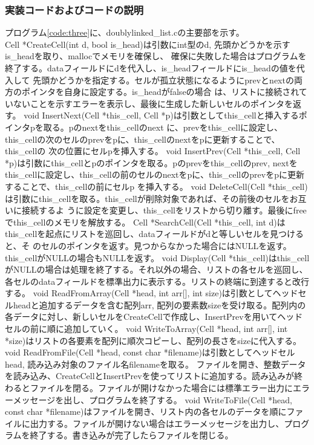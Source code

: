 \documentclass{ltjsarticle}
\begin{document}
\subsubsection{実装コードおよびコードの説明}\label{subsubsec:実装コードおよびコードの説明3}
プログラム\ref{code:three}に、doublylinked\_list.cの主要部を示す。\\ \indent
Cell *CreateCell(int d, bool is\_head)は引数にint型のd, 先頭かどうかを示すis\_headを取り、mallocでメモリを確保し、
確保に失敗した場合はプログラムを終了する。dataフィールドにdを代入し、is\_headフィールドにis_headの値を代入して
先頭かどうかを指定する。セルが孤立状態になるようにprevとnextの両方のポインタを自身に設定する。is\_headがfalseの場合
は、リストに接続されていないことを示すエラーを表示し、最後に生成した新しいセルのポインタを返す。
void InsertNext(Cell *this\_cell, Cell *p)は引数としてthis\_cellと挿入するポインタpを取る。pのnextをthis\_cellのnext
に、prevをthis\_cellに設定し、this\_cellの次のセルのprevをpに、this\_cellのnextをpに更新することで、this\_cellの
次の位置にセルpを挿入する。
void InsertPrev(Cell *this\_cell, Cell *p)は引数にthis\_cellとpのポインタを取る。pのprevをthis\_cellのprev, 
nextをthis\_cellに設定し、this\_cellの前のセルのnextをpに、this\_cellのprevをpに更新することで、this\_cellの前にセルp
を挿入する。
void DeleteCell(Cell *this\_cell)は引数にthis\_cellを取る。this\_cellが削除対象であれば、その前後のセルをお互いに接続するよ
うに設定を変更し、this\_cellをリストから切り離す。最後にfreeでthis\_cellのメモリを解放する。
Cell *SearchCell(Cell *this\_cell, int d)はthis_cellを起点にリストを巡回し、dataフィールドがdと等しいセルを見つけると、そ
のセルのポインタを返す。見つからなかった場合にはNULLを返す。this\_cellがNULLの場合もNULLを返す。
void Display(Cell *this\_cell)はthis\_cellがNULLの場合は処理を終了する。それ以外の場合、リストの各セルを巡回し、各セルのdataフィールドを標準出力に表示する。リストの終端に到達すると改行する。
void ReadFromArray(Cell *head, int arr[], int size)は引数としてヘッドセルheadと追加するデータを含む配列arr, 配列の要素数sizeを受け取る。配列内の各データに対し、新しいセルをCreateCellで作成し、InsertPrevを用いてヘッドセルの前に順に追加していく。
void WriteToArray(Cell *head, int arr[], int *size)はリストの各要素を配列に順次コピーし、配列の長さをsizeに代入する。
void ReadFromFile(Cell *head, const char *filename)は引数としてヘッドセルhead, 読み込み対象のファイル名filenameを取る。
ファイルを開き、整数データを読み込み、CreateCellとInsertPrevを使ってリストに追加する。読み込みが終わるとファイルを閉る。ファイルが開けなかった場合には標準エラー出力にエラーメッセージを出し、プログラムを終了する。
void WriteToFile(Cell *head, const char *filename)はファイルを開き、リスト内の各セルのデータを順にファイルに出力する。ファイルが開けない場合はエラーメッセージを出力し、プログラムを終了する。書き込みが完了したらファイルを閉じる。
\end{document}
